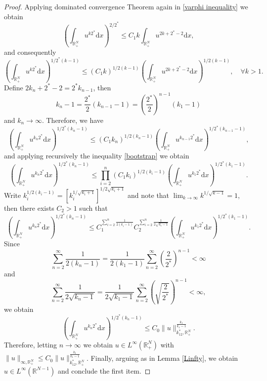 \documentclass[12pt,reqno]{amsart}
\begin{document}
\begin{proof}
Applying dominated convergence Theorem again in \eqref{varphi inequality} we obtain
\begin{equation*}
    \left(\int_{\mathds{R}^N_+}u^{k2^\ast}\mathrm{d}x\right)^{2/2^\ast}\leq C_1 k \int_{\mathds{R}^N_+}u^{2k+2^\ast-2}\mathrm{d}x,
\end{equation*}
and consequently
\begin{equation}\label{bootstrap}
    \left(\int_{\mathds{R}^N_+}u^{k2^\ast}\mathrm{d}x\right)^{1/2^\ast(k-1)}\leq (C_1k)^{1/2(k-1)} \left(\int_{\mathds{R}^N_+} u^{2k
    +2^\ast-2}\mathrm{d}x\right)^{1/2(k-1)},\quad \forall k>1.
\end{equation}
Define $2k_{n}+2^\ast-2=2^\ast k_{n-1}$, then
\begin{equation*}
k_n-1=\frac{2^\ast}{2}(k_{n-1}-1)=\left(\frac{2^\ast}{2}\right)^{n-1}(k_1-1)
\end{equation*}
and $k_n\longrightarrow \infty$. Therefore, we have
\begin{equation*}
    \left(\int_{\mathds{R}^N_+}u^{k_n2^\ast}\mathrm{d}x\right)^{1/2^\ast(k_n-1)}\leq (C_1k_n)^{1/2(k_n-1)} \left(\int_{\mathds{R}^N_+} u^{k_{n-1}2^\ast}\mathrm{d}x\right)^{1/2^\ast(k_{n-1}-1)},
\end{equation*}
and applying recursively the inequality \eqref{bootstrap} we obtain
\begin{equation*}
    \left(\int_{\mathds{R}^N_+}u^{k_n2^\ast}\mathrm{d}x\right)^{1/2^\ast(k_n-1)}\leq \prod_{i=2}^n(C_1k_i)^{1/2(k_i-1)} \left(\int_{\mathds{R}^N_+} u^{k_{1}2^\ast}\mathrm{d}x\right)^{1/2^\ast(k_{1}-1)}.
\end{equation*}
Write $k_i^{1/2(k_i-1)}=\left[k_i^{1/\sqrt{k_i+1}}\right]^{1/2\sqrt{k_i+1}}$ and note that $\displaystyle\lim_{k\longrightarrow \infty}k^{1/\sqrt{k-1}}=1$, then there exists $C_2>1$ such that
\begin{equation*}
  \left(\int_{\mathds{R}^N_+}u^{k_n2^\ast}\mathrm{d}x\right)^{1/2^\ast(k_n-1)}\leq C_1^{\sum_{i=2}^n{\frac{1}{2(k_i-1)}}} C_2^{\sum_{i=2}^n{\frac{1}{2\sqrt{k_i-1}}}} \left(\int_{\mathds{R}^N_+} u^{k_{1}2^\ast}\mathrm{d}x\right)^{1/2^\ast(k_{1}-1)}.
  \end{equation*}
Since
\begin{equation*}
    \sum_{n=2}^\infty \frac{1}{2(k_n-1)}=\frac{1}{2(k_1-1)} \sum_{n=2}^\infty \left(\frac{2}{ 2^\ast}\right)^{n-1}<\infty  
\end{equation*}
and
\begin{equation*}
    \sum_{n=2}^\infty \frac{1}{2\sqrt{k_n-1}}=\frac{1}{2\sqrt{k_1-1}}\sum_{n=2}^\infty \left(\sqrt{\frac{2}{ 2^\ast}}\right)^{n-1}<\infty,
\end{equation*}
we obtain
\begin{equation*}
    \left(\int_{\mathds{R}^N_+}u^{k_n2^\ast}\mathrm{d}x\right)^{1/2^\ast(k_n-1)}\leq C_0\|u\|_{k_12^\ast,\mathds{R}^N_+}^{\frac{k_1}{k_1-1}}.
\end{equation*}
Therefore, letting $n\longrightarrow \infty$ we obtain $u\in L^{\infty}(\mathds{R}^N_+)$ with $\|u\|_{\infty, \mathds{R}^N_+}\leq C_0 \|u\|_{k_12^\ast,\mathds{R}^N_+}^{\frac{k_1}{k_1-1}}$. Finally, arguing as in Lemma \ref{Linfty}, we obtain $u\in L^\infty(\mathds{R}^{N-1})$ and conclude the first item.


\end{proof}
\end{document}
